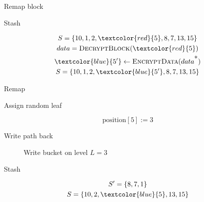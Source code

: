 	\begin{frame}{Remap block}
		
		\begin{block}{Stash}

			\begin{gather*}
				S = \{ 10, 1, 2, \textcolor{red}{5}, 8, 7, 13, 15 \} \\
				data = \textsc{DecryptBlock}(\textcolor{red}{5}) \\
				\textcolor{blue}{5^\prime} \gets \textsc{EncryptData}(data^{\mbox{*}}) \\
				S = \{ 10, 1, 2, \textcolor{blue}{5^\prime}, 8, 7, 13, 15 \}
			\end{gather*}

		\end{block}

		\begin{block}{Remap}
			
			Assign random leaf

			\[
				\text{position}[5] := 3
			\]

		\end{block}
		
	\end{frame}

	\begin{frame}{Write path back}
		
		\selectedtrue%
		\pathreadtrue%

		\nodeonenewtrue%

		\begin{figure}
			\centering

			
			\caption{Write bucket on level $L = 3$}
		\end{figure}

		\vspace{-12pt}

		\begin{block}{Stash}
			
			\begin{gather*}
				S^\prime = \{ 8, 7, 1 \} \\
				S = \{ 10, 2, \textcolor{blue}{5}, 13, 15 \}
			\end{gather*}

		\end{block}
		
	\end{frame}

